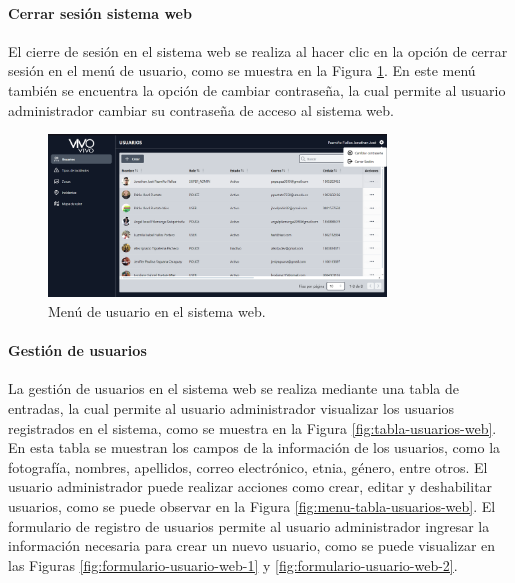 
\paragraph{Cerrar sesión sistema web}
El cierre de sesión en el sistema web se realiza al hacer clic en la opción de cerrar sesión en el menú de usuario, como se muestra
en la Figura \ref{fig:menu-usuario-web}. En este menú también se encuentra la opción de cambiar contraseña, la cual permite al usuario
administrador cambiar su contraseña de acceso al sistema web.

\begin{figure}[H]
    \centering
    \includegraphics[width=0.8\textwidth]{chapters/III-resultados-y-discusion/resources/images/menu-usuario-web.png}
    \caption{Menú de usuario en el sistema web.}
    \label{fig:menu-usuario-web}
\end{figure}

\paragraph{Gestión de usuarios}
La gestión de usuarios en el sistema web se realiza mediante una tabla de entradas, la cual permite al usuario administrador
visualizar los usuarios registrados en el sistema, como se muestra en la Figura \ref{fig:tabla-usuarios-web}. En esta tabla se
muestran los campos de la información de los usuarios, como la fotografía, nombres, apellidos, correo electrónico, etnia, género,
entre otros. El usuario administrador puede realizar acciones como crear, editar y deshabilitar usuarios, como se puede observar en la Figura
\ref{fig:menu-tabla-usuarios-web}. El formulario de registro de usuarios permite al usuario administrador ingresar la información
necesaria para crear un nuevo usuario, como se puede visualizar en las Figuras \ref{fig:formulario-usuario-web-1} y \ref{fig:formulario-usuario-web-2}.

